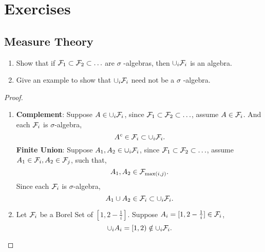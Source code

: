 \chapter{Exercises}

\section{Measure Theory}

\begin{exercise}
	\begin{enumerate}
		\item Show that if \(\mathcal{F}_{1}\subset \mathcal{F}_{2}\subset\ldots\) are \(\sigma\) -algebras, then \(\cup_{i}\mathcal{F}_{i}\) is an algebra.
		\item Give an example to show that \(\cup_{i}\mathcal{F}_{i}\) need not be a \(\sigma\) -algebra.
	\end{enumerate}
\end{exercise}

\begin{proof}
	\begin{enumerate}
		\item
		      \textbf{Complement}: Suppose \(A\in\cup_{i}\mathcal{F}_{i}\), since \(\mathcal{F}_{1}\subset \mathcal{F}_{2}\subset\ldots\), assume \(A\in\mathcal{F}_{i}\). And each \(\mathcal{F}_{i}\) is \(\sigma\)-algebra,
		      \begin{equation*}
			      A^c\in\mathcal{F}_{i}\subset\cup_{i}\mathcal{F}_{i}.
		      \end{equation*}
		      \textbf{Finite Union}: Suppose \(A_1,A_2\in\cup_{i}\mathcal{F}_{i}\), since \(\mathcal{F}_{1}\subset \mathcal{F}_{2}\subset\ldots\), assume \(A_1\in\mathcal{F}_{i},A_2\in\mathcal{F}_{j}\), such that,
		      \begin{equation*}
			      A_1,A_2\in\mathcal{F}_{\max(i,j)}.
		      \end{equation*}
		      Since each \(\mathcal{F}_{i}\) is \(\sigma\)-algebra,
		      \begin{equation*}
			      A_1\cup A_2\in\mathcal{F}_{i}\subset\cup_{i}\mathcal{F}_{i}.
		      \end{equation*}
		\item
		      Let \(\mathcal{F}_{i}\) be a Borel Set of \([1,2-\frac{1}{i}]\). Suppose \(A_i=[1,2-\frac{1}{i}]\in\mathcal{F}_{i}\),
		      \begin{equation*}
			      \cup_{i}A_{i}=[1,2)\notin\cup_{i}\mathcal{F}_{i}.
		      \end{equation*}
	\end{enumerate}
\end{proof}

